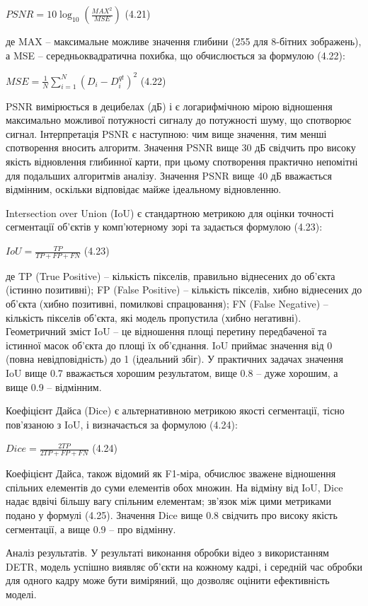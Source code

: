\documentclass[
]{article}
\begin{document}
\(PSNR = 10\log_{10}\left( \frac{{MAX}^{2}}{MSE} \right)\) (4.21)

де MAX -- максимальне можливе значення глибини (255 для 8-бітних зображень), а MSE -- середньоквадратична похибка, що обчислюється за формулою (4.22):

\(MSE = \frac{1}{N}\sum_{i = 1}^{N}\left( D_{i} - D_{i}^{qt} \right)^{2}\) (4.22)

PSNR вимірюється в децибелах (дБ) і є логарифмічною мірою відношення максимально можливої потужності сигналу до потужності шуму, що спотворює сигнал. Інтерпретація PSNR є наступною: чим вище значення, тим менші спотворення вносить алгоритм. Значення PSNR вище 30 дБ свідчить про високу якість відновлення глибинної карти, при цьому спотворення практично непомітні для подальших алгоритмів аналізу. Значення PSNR вище 40 дБ вважається відмінним, оскільки відповідає майже ідеальному відновленню.

Intersection over Union (IoU) є стандартною метрикою для оцінки точності сегментації об'єктів у комп'ютерному зорі та задається формулою (4.23):

\(IoU = \frac{TP}{TP + FP + FN}\) (4.23)

де TP (True Positive) -- кількість пікселів, правильно віднесених до об'єкта (істинно позитивні); FP (False Positive) -- кількість пікселів, хибно віднесених до об'єкта (хибно позитивні, помилкові спрацювання); FN (False Negative) -- кількість пікселів об'єкта, які модель пропустила (хибно негативні). Геометричний зміст IoU -- це відношення площі перетину передбаченої та істинної масок об'єкта до площі їх об'єднання. IoU приймає значення від 0 (повна невідповідність) до 1 (ідеальний збіг). У практичних задачах значення IoU вище 0.7 вважається хорошим результатом, вище 0.8 -- дуже хорошим, а вище 0.9 -- відмінним.

Коефіцієнт Дайса (Dice) є альтернативною метрикою якості сегментації, тісно пов'язаною з IoU, і визначається за формулою (4.24):

\(Dice = \frac{2TP}{2TP + FP + FN}\) (4.24)

Коефіцієнт Дайса, також відомий як F1-міра, обчислює зважене відношення спільних елементів до суми елементів обох множин. На відміну від IoU, Dice надає вдвічі більшу вагу спільним елементам; зв'язок між цими метриками подано у формулі (4.25). Значення Dice вище 0.8 свідчить про високу якість сегментації, а вище 0.9 -- про відмінну.

Аналіз результатів. У результаті виконання обробки відео з використанням DETR, модель успішно виявляє об'єкти на кожному кадрі, і середній час обробки для одного кадру може бути виміряний, що дозволяє оцінити ефективність моделі.
\end{document}
